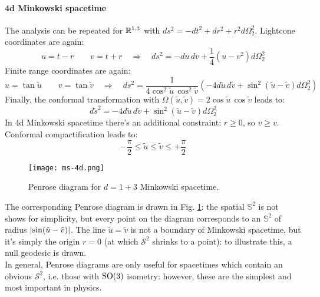 \paragraph{4d Minkowski spacetime}

The analysis can be repeated for $ \mathbb{R}^{1,3} $ with $ ds^2 = -dt^2 + dr^2 + r^2 d\Omega_2^2 $. Lightcone coordinates are again:
\begin{equation*}
  u = t - r
  \qquad
  v = t + r
  \quad \Rightarrow \quad
  ds^2 = - du\, dv + \frac{1}{4} \left( u - v^2 \right) d\Omega_2^2
\end{equation*}
Finite range coordinates are again:
\begin{equation*}
   u = \tan \tilde{u}
  \qquad
  v = \tan \tilde{v}
  \quad \Rightarrow \quad
  ds^2 = \frac{1}{4\cos^2 \tilde{u}\, \cos^2 \tilde{v}} \left( -4 d\tilde{u}\, d\tilde{v} + \sin^2 (\tilde{u} - \tilde{v}) d\Omega_2^2 \right)
\end{equation*}
Finally, the conformal transformation with $ \Omega(\tilde{u},\tilde{v}) = 2 \cos \tilde{u}\, \cos \tilde{v} $ leads to:
\begin{equation*}
  d\tilde{s}^2 = - 4 d\tilde{u}\, d\tilde{v} + \sin^2 (\tilde{u} - \tilde{v}) d\Omega_2^2
\end{equation*}
In 4d Minkowski spacetime there's an additional constraint: $ r \ge 0 $, so $ v \ge v $. Conformal compactification leads to:
\begin{equation*}
  - \frac{\pi}{2} \le \tilde{u} \le \tilde{v} \le + \frac{\pi}{2}
\end{equation*}

\begin{figure}
  \centering
  \texttt{[image: ms-4d.png]}
  \caption{Penrose diagram for $ d = 1 + 3 $ Minkowski spacetime.}
  \label{ms-4d}
\end{figure}

The corresponding Penrose diagram is drawn in Fig. \ref{ms-4d}: the spatial $ \mathbb{S}^2 $ is not shows for simplicity, but every point on the diagram corresponds to an $ \mathbb{S}^2 $ of radius $ \left\lvert\sin (\tilde{u} - \tilde{v})\right\rvert $. The line $ \tilde{u} = \tilde{v} $ is not a boundary of Minkowski spacetime, but it's simply the origin $ r = 0 $ (at which $ \mathcal{S}^2 $ shrinks to a point): to illustrate this, a null geodesic is drawn.\\
In general, Penrose diagrams are only useful for spacetimes which contain an obvious $ \mathcal{S}^2 $, i.e. those with $ \mathrm{SO}(3) $ isometry: however, these are the simplest and most important in physics.

